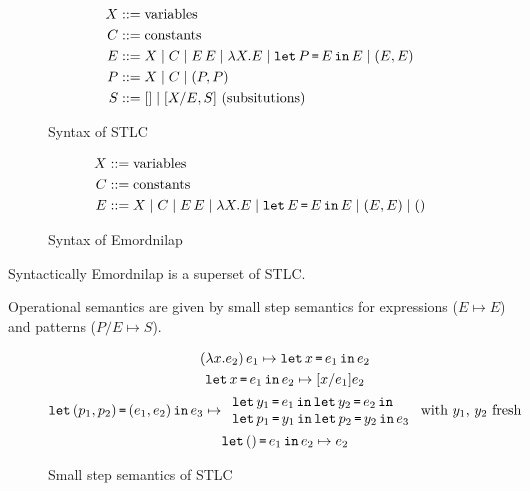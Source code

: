 \documentclass[runningheads,envcountsame]{llncs}
\begin{document}


\begin{figure}
    \begin{align}
        X &::= \text{variables} \\
        C &::= \text{constants} \\
        E &::= X \mid C \mid E\,E \mid \lambda X. E \mid \texttt{let}\,P\,\texttt{=}\,E\,\texttt{in}\,E \mid (E, E) \\
        P &::= X \mid C \mid (P, P) \\
        S &::= [] \mid [X/E, S] \text{ (subsitutions)}
    \end{align}
    \caption{Syntax of STLC}
\end{figure}

\begin{figure}
    \begin{align}
        X &::= \text{variables} \\
        C &::= \text{constants} \\
        E &::= X \mid C \mid E\,E \mid \lambda X. E \mid \texttt{let}\,E\,\texttt{=}\,E\,\texttt{in}\,E \mid (E, E) \mid ()
    \end{align}
    \caption{Syntax of Emordnilap}
\end{figure}

\begin{lemma}
    Syntactically Emordnilap is a superset of STLC.
\end{lemma}

Operational semantics are given by small step semantics for expressions ($E \mapsto E$) and patterns ($P / E \mapsto S$).

\begin{figure}
    \begin{gather}
        (\lambda x. e_2)\,e_1 \mapsto \texttt{let}\,x\,\texttt{=}\,e_1\,\texttt{in}\,e_2 \\
        \texttt{let}\,x\,\texttt{=}\,e_1\,\texttt{in}\,e_2 \mapsto [x/e_1]e_2 \\
        \texttt{let}\,(p_1, p_2)\,\texttt{=}\,(e_1, e_2)\,\texttt{in}\,e_3 \mapsto \begin{array}{l}
            \texttt{let}\,y_1\,\texttt{=}\,e_1\,\texttt{in}\,\texttt{let}\,y_2\,\texttt{=}\,e_2\,\texttt{in}\,\\
            \texttt{let}\,p_1\,\texttt{=}\,y_1\,\texttt{in}\,\texttt{let}\,p_2\,\texttt{=}\,y_2\,\texttt{in}\,e_3\\            
        \end{array} \text{ with $y_1$, $y_2$ fresh}\\
        \texttt{let}\,()\,\texttt{=}\,e_1\,\texttt{in}\,e_2 \mapsto e_2
    \end{gather}
    \caption{Small step semantics of STLC}
\end{figure}
    
\end{document}

